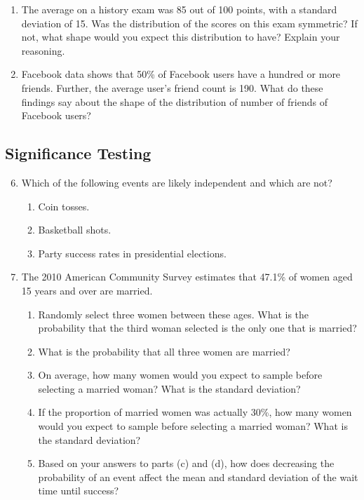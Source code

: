 \documentclass[10pt]{article}
\begin{document}
\begin{enumerate}
    \item The average on a history exam was 85 out of 100 points, with a standard deviation of 15. Was the distribution of the scores on this exam symmetric? If not, what shape would you expect this distribution to have? Explain your reasoning.

    \item Facebook data shows that 50\% of Facebook users have a hundred or more friends. Further, the average user's friend count is 190. What do these findings say about the shape of the distribution of number of friends of Facebook users?
\end{enumerate}

\subsection*{Significance Testing}

\begin{enumerate}
    \setcounter{enumi}{5}
    \item Which of the following events are likely independent and which are not?
    \begin{enumerate}
        \item Coin tosses.
        \item Basketball shots.
        \item Party success rates in presidential elections.
    \end{enumerate}

    \item The 2010 American Community Survey estimates that 47.1\% of women aged 15 years and over are married.
    \begin{enumerate}
        \item Randomly select three women between these ages. What is the probability that the third woman selected is the only one that is married?
        \item What is the probability that all three women are married?
        \item On average, how many women would you expect to sample before selecting a married woman? What is the standard deviation?
        \item If the proportion of married women was actually 30\%, how many women would you expect to sample before selecting a married woman? What is the standard deviation?
        \item Based on your answers to parts (c) and (d), how does decreasing the probability of an event affect the mean and standard deviation of the wait time until success?
    \end{enumerate}
\end{enumerate}
\end{document}
